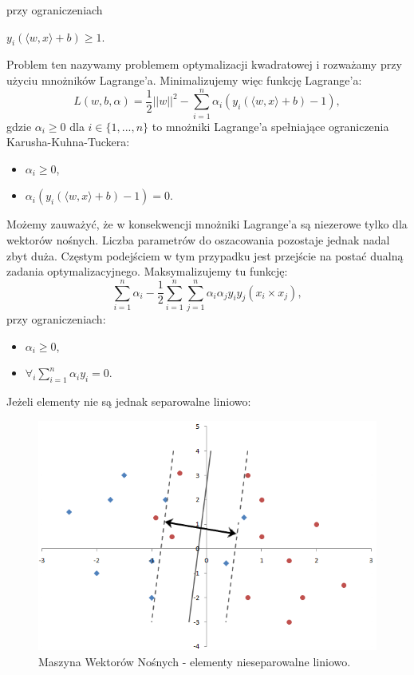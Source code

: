 \documentclass[12pt,a4paper]{report}
\begin{document}
przy ograniczeniach
\begin{center}
$y_i(\langle w,x \rangle + b) \geq 1$.
\end{center}
Problem ten nazywamy problemem optymalizacji kwadratowej i rozważamy przy użyciu mnożników Lagrange'a. Minimalizujemy więc funkcję Lagrange'a:
$$L(w,b,\alpha)=\frac{1}{2}||w||^2 - \sum_{i=1}^n \alpha_i(y_i(\langle w,x \rangle + b)-1),$$
gdzie
$\alpha_i \geq 0$ dla $i \in \{1,...,n\}$ to mnożniki Lagrange'a spełniające ograniczenia Karusha-Kuhna-Tuckera:
\begin{itemize}
\item $\alpha_i \geq 0$,
\item $\alpha_i(y_i(\langle w,x \rangle + b)-1) = 0$.
\end{itemize}
Możemy zauważyć, że w konsekwencji mnożniki Lagrange'a są niezerowe tylko dla wektorów nośnych. Liczba parametrów do oszacowania pozostaje jednak nadal zbyt duża. Częstym podejściem w tym przypadku jest przejście na postać dualną zadania optymalizacyjnego.
Maksymalizujemy tu funkcję:
$$\sum_{i=1}^n \alpha_i - \frac{1}{2} \sum_{i=1}^n \sum_{j=1}^{n} \alpha_i \alpha_j y_i y_j(x_i \times x_j),$$
przy ograniczeniach:
\begin{itemize}
\item $\alpha_i \geq 0$,
\item $\forall_i \sum_{i=1}^n \alpha_i y_i =0$.
\end{itemize}
\bigskip
\bigskip
\bigskip
Jeżeli elementy nie są jednak separowalne liniowo:
\begin{center}
\begin{figure}[H]
\centering
\includegraphics[scale=0.5]{SVM2.PNG} 
\caption{Maszyna Wektorów Nośnych - elementy nieseparowalne liniowo.}
\end{figure}
\end{center}
\end{document}
